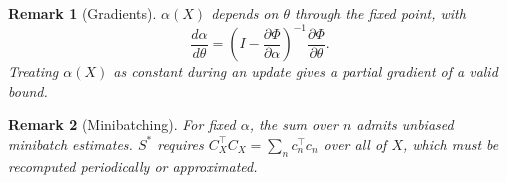 \documentclass[11pt]{article}
\newtheorem{remark}{Remark}
\begin{document}
\begin{remark}[Gradients]
$\alpha(X)$ depends on $\theta$ through the fixed point, with
\[
\frac{d\alpha}{d\theta} = \left(I - \frac{\partial\Phi}{\partial\alpha}\right)^{-1}\frac{\partial\Phi}{\partial\theta}.
\]
Treating $\alpha(X)$ as constant during an update gives a partial gradient of a valid bound.
\end{remark}

\begin{remark}[Minibatching]
For fixed $\alpha$, the sum over $n$ admits unbiased minibatch estimates. $S^\ast$ requires
$C_X^\top C_X = \sum_n c_n^\top c_n$ over all of $X$, which must be recomputed periodically
or approximated.
\end{remark}
\end{document}
